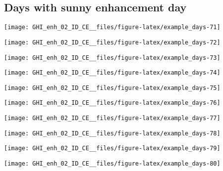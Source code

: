 \documentclass[
  10pt,
  a4paper,oneside]{article}
\begin{document}
\FloatBarrier

\hypertarget{days-with-sunny-enhancement-day}{%
\subsection{Days with sunny enhancement day}\label{days-with-sunny-enhancement-day}}

\begin{center}\texttt{[image: GHI\_enh\_02\_ID\_CE\_\_files/figure-latex/example\_days-71]} \end{center}

\begin{center}\texttt{[image: GHI\_enh\_02\_ID\_CE\_\_files/figure-latex/example\_days-72]} \end{center}

\begin{center}\texttt{[image: GHI\_enh\_02\_ID\_CE\_\_files/figure-latex/example\_days-73]} \end{center}

\begin{center}\texttt{[image: GHI\_enh\_02\_ID\_CE\_\_files/figure-latex/example\_days-74]} \end{center}

\begin{center}\texttt{[image: GHI\_enh\_02\_ID\_CE\_\_files/figure-latex/example\_days-75]} \end{center}

\begin{center}\texttt{[image: GHI\_enh\_02\_ID\_CE\_\_files/figure-latex/example\_days-76]} \end{center}

\begin{center}\texttt{[image: GHI\_enh\_02\_ID\_CE\_\_files/figure-latex/example\_days-77]} \end{center}

\begin{center}\texttt{[image: GHI\_enh\_02\_ID\_CE\_\_files/figure-latex/example\_days-78]} \end{center}

\begin{center}\texttt{[image: GHI\_enh\_02\_ID\_CE\_\_files/figure-latex/example\_days-79]} \end{center}

\begin{center}\texttt{[image: GHI\_enh\_02\_ID\_CE\_\_files/figure-latex/example\_days-80]} \end{center}
\end{document}
